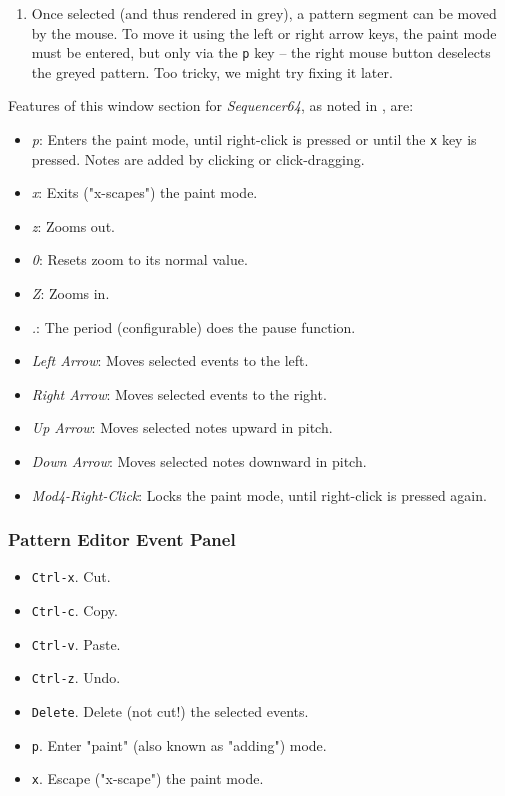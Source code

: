    \begin{enumerate}
      \item Once selected (and thus rendered in grey), a pattern segment
         can be moved by the mouse.  To move it using the left or right
         arrow keys, the paint mode must be entered, but only via the
         \texttt{p} key -- the right mouse button deselects the greyed pattern.
         Too tricky, we might try fixing it later.
   \end{enumerate}

   Features of this window section for \textsl{Sequencer64}, as noted in
   , are:

   \begin{itemize}
      \item \textsl{p}:  Enters the paint mode, until right-click is pressed or
         until the \texttt{x} key is pressed.  Notes are added
         by clicking or click-dragging.
      \item \textsl{x}:  Exits ("x-scapes") the paint mode.
      \item \textsl{z}:  Zooms out.
      \item \textsl{0}:  Resets zoom to its normal value.
      \item \textsl{Z}:  Zooms in.
      \item \textsl{.}:  The period (configurable) does the pause function.
      \item \textsl{Left Arrow}:  Moves selected events to the left.
      \item \textsl{Right Arrow}:  Moves selected events to the right.
      \item \textsl{Up Arrow}:  Moves selected notes upward in pitch.
      \item \textsl{Down Arrow}:  Moves selected notes downward in pitch.
      \item \textsl{Mod4-Right-Click}:  Locks the paint mode, until right-click
         is pressed again.
   \end{itemize}

\subsubsection{Pattern Editor Event Panel}
\label{subsubsec:kbd_mouse_pattern_editor_event_panel}

   \begin{itemize}
      \item \texttt{Ctrl-x}. Cut.
      \item \texttt{Ctrl-c}. Copy.
      \item \texttt{Ctrl-v}. Paste.
      \item \texttt{Ctrl-z}. Undo.
      \item \texttt{Delete}.  Delete (not cut!) the selected events.
      \item \texttt{p}.  Enter "paint" (also known as "adding") mode.
      \item \texttt{x}.  Escape ("x-scape") the paint mode.
   \end{itemize}

